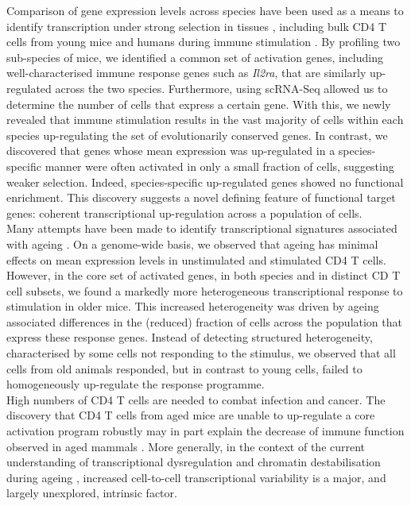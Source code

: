 Comparison of gene expression levels across species have been used as a means to identify transcription under strong selection in tissues \citep{Sudmant2015, Brawand2011, Romero2012, Barbosa-Morais2012, Perry2012}, including bulk CD4\plus{} T cells from young mice and humans during immune stimulation \citep{Shay2013}. By profiling two sub-species of mice, we identified a common set of activation genes, including well-characterised immune response genes such as \textit{Il2ra}, that are similarly up-regulated across the two species. Furthermore, using scRNA-Seq allowed us to determine the number of cells that express a certain gene. With this, we newly revealed that immune stimulation results in the vast majority of cells within each species up-regulating the set of evolutionarily conserved genes. In contrast, we discovered that genes whose mean expression was up-regulated in a species-specific manner were often activated in only a small fraction of cells, suggesting weaker selection. Indeed, species-specific up-regulated genes showed no functional enrichment. This discovery suggests a novel defining feature of functional target genes: coherent transcriptional up-regulation across a population of cells. \\

Many attempts have been made to identify transcriptional signatures associated with ageing \citep{DeMagalhaes2009, Magalhaes2009, Chen2013, Kowalczyk2015}. On a genome-wide basis, we observed that ageing has minimal effects on mean expression levels in unstimulated and stimulated CD4\plus{} T cells. However, in the core set of activated genes, in both species and in distinct CD\plus{} T cell subsets, we found a markedly more heterogeneous transcriptional response to stimulation in older mice. This increased heterogeneity was driven by ageing associated differences in the (reduced) fraction of cells across the population that express these response genes. Instead of detecting structured heterogeneity, characterised by some cells not responding to the stimulus, we observed that all cells from old animals responded, but in contrast to young cells, failed to homogeneously up-regulate the response programme. \\

High numbers of CD4\plus{} T cells are needed to combat infection and cancer. The discovery that CD4\plus{} T cells from aged mice are unable to up-regulate a core activation program robustly may in part explain the decrease of immune function observed in aged mammals \citep{Goronzy2013, Nikolich-Zugich2018}. More generally, in the context of the current understanding of transcriptional dysregulation and chromatin destabilisation during ageing \citep{Booth2016}, increased cell-to-cell transcriptional variability is a major, and largely unexplored, intrinsic factor.\\


